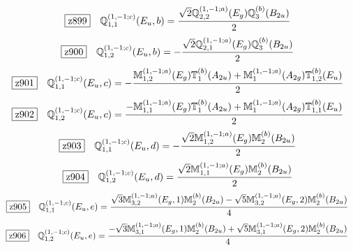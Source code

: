\documentclass[fleqn,10pt,landscape]{jsarticle}
\begin{document}
\begin{dmath*}
\hspace*{3mm}\fbox{z899}\quad \mathbb{Q}_{1,1}^{(1,-1;c)}(E_{u},b)=\frac{\sqrt{2} \mathbb{Q}_{2,2}^{(1,-1;a)}(E_{g}) \mathbb{Q}_{3}^{(b)}(B_{2u})}{2}
\end{dmath*}
\begin{dmath*}
\hspace*{3mm}\fbox{z900}\quad \mathbb{Q}_{1,2}^{(1,-1;c)}(E_{u},b)=- \frac{\sqrt{2} \mathbb{Q}_{2,1}^{(1,-1;a)}(E_{g}) \mathbb{Q}_{3}^{(b)}(B_{2u})}{2}
\end{dmath*}
\begin{dmath*}
\hspace*{3mm}\fbox{z901}\quad \mathbb{Q}_{1,1}^{(1,-1;c)}(E_{u},c)=- \frac{\mathbb{M}_{1,2}^{(1,-1;a)}(E_{g}) \mathbb{T}_{1}^{(b)}(A_{2u}) + \mathbb{M}_{1}^{(1,-1;a)}(A_{2g}) \mathbb{T}_{1,2}^{(b)}(E_{u})}{2}
\end{dmath*}
\begin{dmath*}
\hspace*{3mm}\fbox{z902}\quad \mathbb{Q}_{1,2}^{(1,-1;c)}(E_{u},c)=\frac{- \mathbb{M}_{1,1}^{(1,-1;a)}(E_{g}) \mathbb{T}_{1}^{(b)}(A_{2u}) + \mathbb{M}_{1}^{(1,-1;a)}(A_{2g}) \mathbb{T}_{1,1}^{(b)}(E_{u})}{2}
\end{dmath*}
\begin{dmath*}
\hspace*{3mm}\fbox{z903}\quad \mathbb{Q}_{1,1}^{(1,-1;c)}(E_{u},d)=- \frac{\sqrt{2} \mathbb{M}_{1,2}^{(1,-1;a)}(E_{g}) \mathbb{M}_{2}^{(b)}(B_{2u})}{2}
\end{dmath*}
\begin{dmath*}
\hspace*{3mm}\fbox{z904}\quad \mathbb{Q}_{1,2}^{(1,-1;c)}(E_{u},d)=\frac{\sqrt{2} \mathbb{M}_{1,1}^{(1,-1;a)}(E_{g}) \mathbb{M}_{2}^{(b)}(B_{2u})}{2}
\end{dmath*}
\begin{dmath*}
\hspace*{3mm}\fbox{z905}\quad \mathbb{Q}_{1,1}^{(1,-1;c)}(E_{u},e)=\frac{\sqrt{3} \mathbb{M}_{3,2}^{(1,-1;a)}(E_{g},1) \mathbb{M}_{2}^{(b)}(B_{2u}) - \sqrt{5} \mathbb{M}_{3,2}^{(1,-1;a)}(E_{g},2) \mathbb{M}_{2}^{(b)}(B_{2u})}{4}
\end{dmath*}
\begin{dmath*}
\hspace*{3mm}\fbox{z906}\quad \mathbb{Q}_{1,2}^{(1,-1;c)}(E_{u},e)=\frac{- \sqrt{3} \mathbb{M}_{3,1}^{(1,-1;a)}(E_{g},1) \mathbb{M}_{2}^{(b)}(B_{2u}) + \sqrt{5} \mathbb{M}_{3,1}^{(1,-1;a)}(E_{g},2) \mathbb{M}_{2}^{(b)}(B_{2u})}{4}
\end{dmath*}
\end{document}
